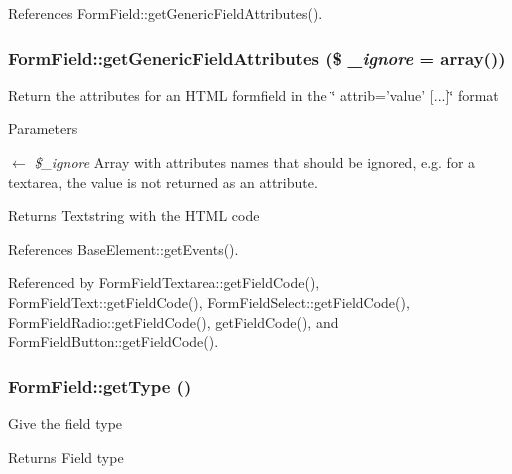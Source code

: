 References FormField::getGenericFieldAttributes().

\subsubsection[{getGenericFieldAttributes}]{\setlength{\rightskip}{0pt plus 5cm}FormField::getGenericFieldAttributes (\$ {\em \_\-ignore} = {\ttfamily array()})}\label{classFormField_a9f9d136ba8b4a793f22370aff43d592d}
Return the attributes for an HTML formfield in the \char`\"{} attrib='value' \mbox{[}...\mbox{]}\char`\"{} format


\begin{DoxyParams}{Parameters}
\item[\mbox{$\leftarrow$} {\em \$\_\-ignore}]Array with attributes names that should be ignored, e.g. for a textarea, the value is not returned as an attribute. \end{DoxyParams}
\begin{DoxyReturn}{Returns}
Textstring with the HTML code 
\end{DoxyReturn}


References BaseElement::getEvents().



Referenced by FormFieldTextarea::getFieldCode(), FormFieldText::getFieldCode(), FormFieldSelect::getFieldCode(), FormFieldRadio::getFieldCode(), getFieldCode(), and FormFieldButton::getFieldCode().

\subsubsection[{getType}]{\setlength{\rightskip}{0pt plus 5cm}FormField::getType ()}\label{classFormField_a1f64b737bccb6b2827f8c5665b9920c7}
Give the field type \begin{DoxyReturn}{Returns}
Field type 
\end{DoxyReturn}
